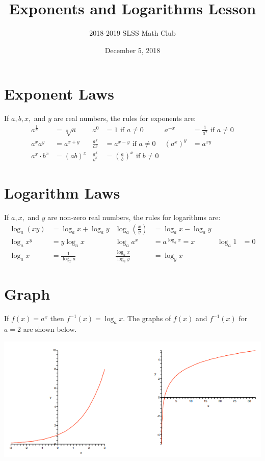 \documentclass[12pt]{article}
\title{Exponents and Logarithms Lesson\vspace{-3mm}}
\author{2018-2019 SLSS Math Club\vspace{-5mm}}
\date{December 5, 2018\vspace{-5mm}}
\begin{document}
\maketitle
\section{Exponent Laws}
If $a, b, x,$ and $y$ are real numbers, the rules for exponents are:
\begin{align*}
    a^{\frac{1}{n}} &= \sqrt[n]{a} & a^0 &= 1 \text{ if } a \neq 0 & a^{-x} &= \frac{1}{a^x} \text{ if } a \neq 0 \\
    a^x a^y &= a^{x + y} & \frac{a^x}{a^y} &= a^{x - y} \text{ if } a \neq 0 & (a^x)^y &= a^{xy} \\
    a^x \cdot b^x &= (ab)^x & \frac{a^x}{b^x} &= (\frac{a}{b})^x \text{ if } b \neq 0
\end{align*}

\section{Logarithm Laws}
If $a, x,$ and $y$ are non-zero real numbers, the rules for logarithms are:
\begin{align*}
    \log_a(xy) &= \log_a{x} + \log_a{y} & \log_a{(\frac{x}{y})} &= \log_a{x} - \log_a{y} \\
    \log_a{x^y} &= y\log_a{x} & \log_a{a^x} &= a^{\log_a{x}} = x & \log_a{1} &= 0 \\
    \log_a{x} &= \frac{1}{\log_x{a}} & \frac{\log_a{x}}{\log_a{y}} &= \log_y{x}
\end{align*}

\section{Graph}
If $f(x) = a^x$ then $f^{-1}(x) = \log_ax$. The graphs of $f(x)$ and $f^{-1}(x)$ for $a = 2$ are shown below.
\begin{center}
    \includegraphics[scale = 1.0]{Graphics/Week_9/Graph.PNG}
\end{center}
\end{document}

